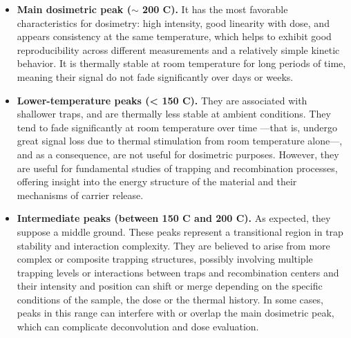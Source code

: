 \begin{itemize}
  \item \textbf{Main dosimetric peak ($\sim$ 200 \textdegree C).} It has the most favorable characteristics for dosimetry: high intensity, good linearity with dose, and appears consistency at the same temperature, which helps to exhibit good reproducibility across different measurements and a relatively simple kinetic behavior. It is thermally stable at room temperature for long periods of time, meaning their signal do not fade significantly over days or weeks. 
  \item \textbf{Lower-temperature peaks (< 150 \textdegree C).} They are associated with shallower traps, and are thermally less stable at ambient conditions. They tend to fade significantly at room temperature over time ---that is, undergo great signal loss due to thermal stimulation from room temperature alone---, and as a consequence, are not useful for dosimetric purposes. However, they are useful for fundamental studies of trapping and recombination processes, offering insight into the energy structure of the material and their mechanisms of carrier release. 
  \item \textbf{Intermediate peaks (between 150 \textdegree C and 200 \textdegree C).} As expected, they suppose a middle ground. These peaks represent a transitional region in trap stability and interaction complexity. They are believed to arise from more complex or composite trapping structures, possibly involving multiple trapping levels or interactions between traps and recombination centers and their intensity and position can shift or merge depending on the specific conditions of the sample, the dose or the thermal history. In some cases, peaks in this range can interfere with or overlap the main dosimetric peak, which can complicate deconvolution and dose evaluation.
\end{itemize}
